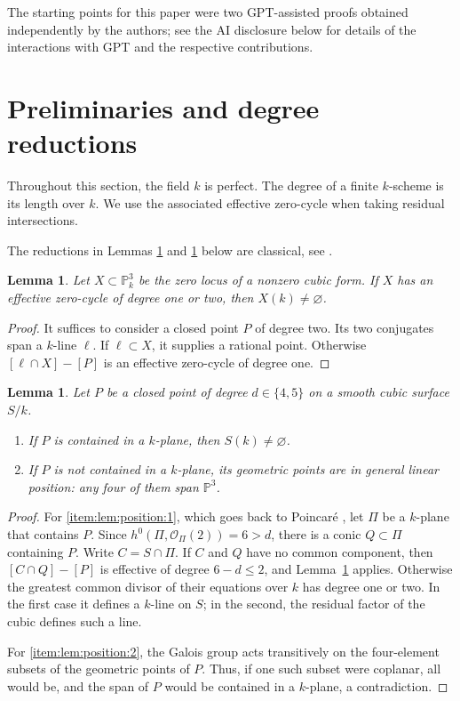 \documentclass[a4paper,11pt]{amsart}
\numberwithin{equation}{section}
\newtheorem{lemma}[theorem]{Lemma}
\theoremstyle{definition}
\theoremstyle{remark}
\newcommand{\PP}{\mathbb P}
\newcommand{\OO}{\mathcal O}
\begin{document}
The starting points for this paper were two GPT-assisted proofs obtained independently by the authors; see the AI disclosure below for details of the interactions with GPT and the respective contributions.


\section{Preliminaries and degree reductions} \label{sec:preliminaries}
 
Throughout this section, the field $k$ is perfect.
The degree of a finite $k$-scheme is its length over $k$. 
We use the associated effective zero-cycle when taking residual intersections.

The reductions in Lemmas \ref{lem:secant} and \ref{lem:position} below 
are classical, see \cite[Propositions~2.2 and~2.3]{coray}. 

\begin{lemma}
\label{lem:secant}
Let $X\subset\PP^3_k$ be the zero locus of a nonzero cubic form.
If $X$ has an effective zero-cycle of degree one or two, then
$X(k)\ne\varnothing$.
\end{lemma}
\begin{proof}
It suffices to consider a closed point $P$ of degree two. Its two
conjugates span a $k$-line $\ell$. If $\ell\subset X$, it supplies a
rational point. Otherwise $[\ell\cap X]-[P]$ is an effective
zero-cycle of degree one.
\end{proof}

\begin{lemma}\label{lem:position}
Let $P$ be a closed point of degree $d\in\{4,5\}$ on a smooth cubic
surface $S/k$.
\begin{enumerate}
\item If $P$ is contained in a $k$-plane, then $S(k)\ne\varnothing$.\label{item:lem:position:1}
\item If $P$ is not contained in a $k$-plane, its geometric points are
in general linear position: any four of them span $\PP^3$.\label{item:lem:position:2}
\end{enumerate}
\end{lemma}
\begin{proof}
For \eqref{item:lem:position:1}, which goes back to Poincar\'e \cite{poincare}, 
let $\Pi$ be a $k$-plane that contains $P$. 
Since $h^0(\Pi,\OO_\Pi(2))=6>d$, there is a conic $Q\subset\Pi$
containing $P$. Write $C=S\cap\Pi$. If $C$ and $Q$ have no common
component, then $[C\cap Q]-[P]$ is effective of degree $6-d\le2$,
and Lemma~\ref{lem:secant} applies. Otherwise the greatest common
divisor of their equations over $k$ has degree one or two. In the
first case it defines a $k$-line on $S$; in the second, the residual
factor of the cubic defines such a line.

For \eqref{item:lem:position:2}, the Galois group acts transitively
on the four-element subsets of the geometric points of $P$.
Thus, if one such subset were coplanar, all would be, and the
span of $P$ would be contained in a $k$-plane, a contradiction. 
\end{proof}
\end{document}
